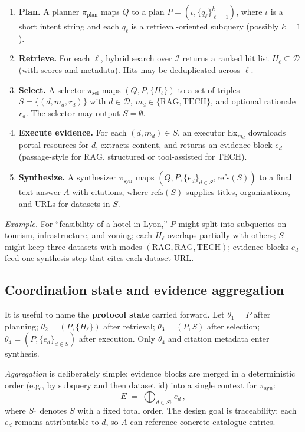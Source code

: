 \documentclass[sigconf,anonymous]{acmart}
\begin{document}
\begin{enumerate}
  \item \textbf{Plan.} A planner $\pi_{\mathrm{plan}}$ maps $Q$ to a plan $P=(\iota, \{q_\ell\}_{\ell=1}^{k})$, where $\iota$ is a short intent string and each $q_\ell$ is a retrieval-oriented subquery (possibly $k{=}1$).
  \item \textbf{Retrieve.} For each $\ell$, hybrid search over $\mathcal{I}$ returns a ranked hit list $H_\ell \subseteq \mathcal{D}$ (with scores and metadata). Hits may be deduplicated across $\ell$.
  \item \textbf{Select.} A selector $\pi_{\mathrm{sel}}$ maps $(Q, P, \{H_\ell\})$ to a set of triples $S=\{(d,m_d,r_d)\}$ with $d\in\mathcal{D}$, $m_d\in\{\mathrm{RAG},\mathrm{TECH}\}$, and optional rationale $r_d$. The selector may output $S=\emptyset$.
  \item \textbf{Execute evidence.} For each $(d,m_d)\in S$, an executor $\mathrm{Ex}_{m_d}$ downloads portal resources for $d$, extracts content, and returns an evidence block $e_d$ (passage-style for $\mathrm{RAG}$, structured or tool-assisted for $\mathrm{TECH}$).
  \item \textbf{Synthesize.} A synthesizer $\pi_{\mathrm{syn}}$ maps $(Q, P, \{e_d\}_{d\in S}, \mathrm{refs}(S))$ to a final text answer $A$ with citations, where $\mathrm{refs}(S)$ supplies titles, organizations, and URLs for datasets in $S$.
\end{enumerate}

\smallskip
\noindent\emph{Example.} For ``feasibility of a hotel in Lyon,'' $P$ might split into subqueries on tourism, infrastructure, and zoning; each $H_\ell$ overlaps partially with others; $S$ might keep three datasets with modes $(\mathrm{RAG},\mathrm{RAG},\mathrm{TECH})$; evidence blocks $e_d$ feed one synthesis step that cites each dataset URL.

\subsection{Coordination state and evidence aggregation}
\label{sec:protocol-coordination}

It is useful to name the \textbf{protocol state} carried forward. Let $\theta_1=P$ after planning; $\theta_2=(P,\{H_\ell\})$ after retrieval; $\theta_3=(P,S)$ after selection; $\theta_4=(P,\{e_d\}_{d\in S})$ after execution. Only $\theta_4$ and citation metadata enter synthesis.

\emph{Aggregation} is deliberately simple: evidence blocks are merged in a deterministic order (e.g., by subquery and then dataset id) into a single context for $\pi_{\mathrm{syn}}$:
\begin{equation}
  E \;=\; \bigoplus_{d\in S^{\downarrow}} e_d\,,
\end{equation}
where $S^{\downarrow}$ denotes $S$ with a fixed total order. The design goal is traceability: each $e_d$ remains attributable to $d$, so $A$ can reference concrete catalogue entries.
\end{document}
